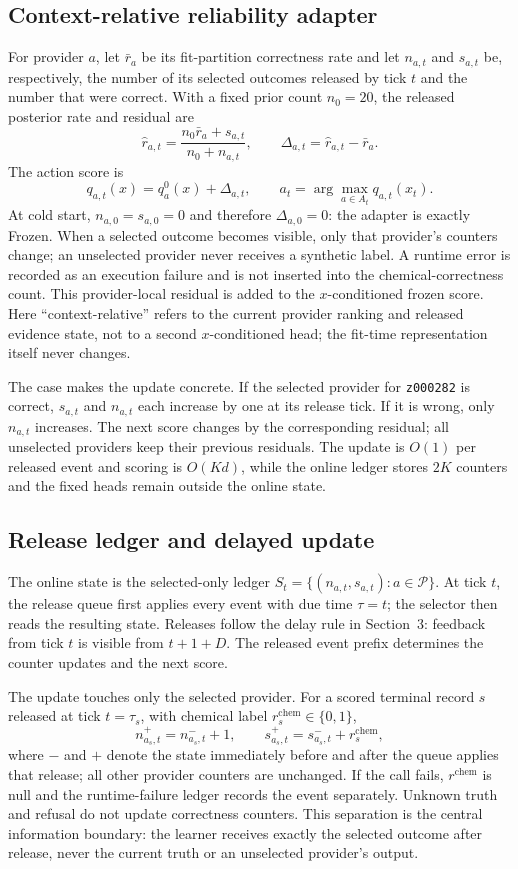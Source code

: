 \documentclass[sigconf,anonymous]{aamas}
\begin{document}
\subsection{Context-relative reliability adapter}
For provider $a$, let $\bar r_a$ be its fit-partition correctness rate and let $n_{a,t}$ and $s_{a,t}$ be, respectively, the number of its selected outcomes released by tick $t$ and the number that were correct. With a fixed prior count $n_0=20$, the released posterior rate and residual are
$$
\widehat r_{a,t}=\frac{n_0\bar r_a+s_{a,t}}{n_0+n_{a,t}},\qquad
\Delta_{a,t}=\widehat r_{a,t}-\bar r_a.
$$
The action score is
$$
q_{a,t}(x)=q_a^0(x)+\Delta_{a,t},
\qquad
 a_t=\arg\max_{a\in A_t}q_{a,t}(x_t).
$$
At cold start, $n_{a,0}=s_{a,0}=0$ and therefore $\Delta_{a,0}=0$: the adapter is exactly Frozen. When a selected outcome becomes visible, only that provider's counters change; an unselected provider never receives a synthetic label. A runtime error is recorded as an execution failure and is not inserted into the chemical-correctness count. This provider-local residual is added to the $x$-conditioned frozen score. Here ``context-relative'' refers to the current provider ranking and released evidence state, not to a second $x$-conditioned head; the fit-time representation itself never changes.

The case makes the update concrete. If the selected provider for \texttt{z000282} is correct, $s_{a,t}$ and $n_{a,t}$ each increase by one at its release tick. If it is wrong, only $n_{a,t}$ increases. The next score changes by the corresponding residual; all unselected providers keep their previous residuals. The update is $O(1)$ per released event and scoring is $O(Kd)$, while the online ledger stores $2K$ counters and the fixed heads remain outside the online state.

\subsection{Release ledger and delayed update}
The online state is the selected-only ledger $S_t=\{(n_{a,t},s_{a,t}) : a\in\mathcal P\}$. At tick $t$, the release queue first applies every event with due time $\tau=t$; the selector then reads the resulting state. Releases follow the delay rule in Section~3: feedback from tick $t$ is visible from $t+1+D$. The released event prefix determines the counter updates and the next score.

The update touches only the selected provider. For a scored terminal record $s$ released at tick $t=\tau_s$, with chemical label $r_s^{\mathrm{chem}}\in\{0,1\}$,
$$
 n_{a_s,t}^{+}=n_{a_s,t}^{-}+1,\qquad
 s_{a_s,t}^{+}=s_{a_s,t}^{-}+r_s^{\mathrm{chem}},
$$
where $-$ and $+$ denote the state immediately before and after the queue applies that release; all other provider counters are unchanged. If the call fails, $r^{\mathrm{chem}}$ is null and the runtime-failure ledger records the event separately. Unknown truth and refusal do not update correctness counters. This separation is the central information boundary: the learner receives exactly the selected outcome after release, never the current truth or an unselected provider's output.
\end{document}
